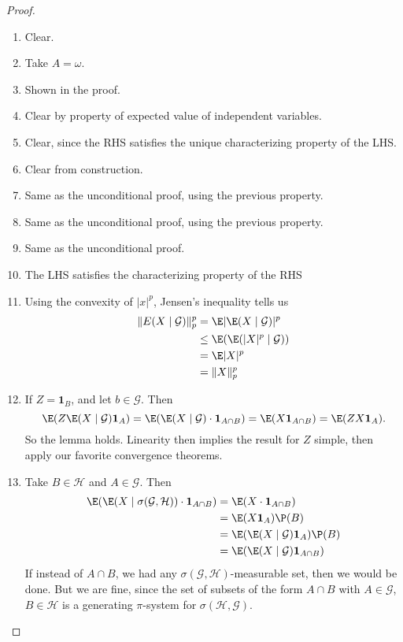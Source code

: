 \documentclass[a4paper]{article}
\begin{document}
\begin{proof}\leavevmode
  \begin{enumerate} %
    \item Clear.
    \item Take $A = \omega$.
    \item Shown in the proof.
    \item Clear by property of expected value of independent variables.
    \item Clear, since the RHS satisfies the unique characterizing property of the LHS.
    \item Clear from construction.
    \item Same as the unconditional proof, using the previous property.
    \item Same as the unconditional proof, using the previous property.
    \item Same as the unconditional proof.
    \item The LHS satisfies the characterizing property of the RHS
    \item Using the convexity of $|x|^p$, Jensen's inequality tells us
      \begin{align*}
        \|E(X \mid \mathcal{G})\|_p^p &= \E |\E(X \mid \mathcal{G})|^p\\
        &\leq \E (\E (|X|^p \mid \mathcal{G}))\\
        &= \E |X|^p\\
        &= \|X\|_p^p
      \end{align*}
    \item If $Z = \mathbf{1}_B$, and let $b \in \mathcal{G}$. Then
      \[
        \E(Z \E(X \mid \mathcal{G}) \mathbf{1}_A) = \E (\E (X \mid \mathcal{G}) \cdot \mathbf{1}_{A \cap B}) = \E(X \mathbf{1}_{A \cap B}) = \E(Z X \mathbf{1}_A).
      \]
      So the lemma holds. Linearity then implies the result for $Z$ simple, then apply our favorite convergence theorems.
    \item Take $B \in \mathcal{H}$ and $A \in \mathcal{G}$. Then
      \begin{align*}
        \E(\E(X \mid \sigma(\mathcal{G}, \mathcal{H}))\cdot \mathbf{1}_{A \cap B}) &= \E(X \cdot \mathbf{1}_{A \cap B})\\
        &= \E(X \mathbf{1}_A) \P(B)\\
        &= \E(\E(X \mid \mathcal{G}) \mathbf{1}_A) \P(B)\\
        &= \E(\E(X \mid \mathcal{G}) \mathbf{1}_{A \cap B})
      \end{align*}
      If instead of $A \cap B$, we had any $\sigma(\mathcal{G}, \mathcal{H})$-measurable set, then we would be done. But we are fine, since the set of subsets of the form $A \cap B$ with $A \in \mathcal{G}$, $B \in \mathcal{H}$ is a generating $\pi$-system for $\sigma(\mathcal{H}, \mathcal{G})$. \qedhere
  \end{enumerate}
\end{proof}
\end{document}
